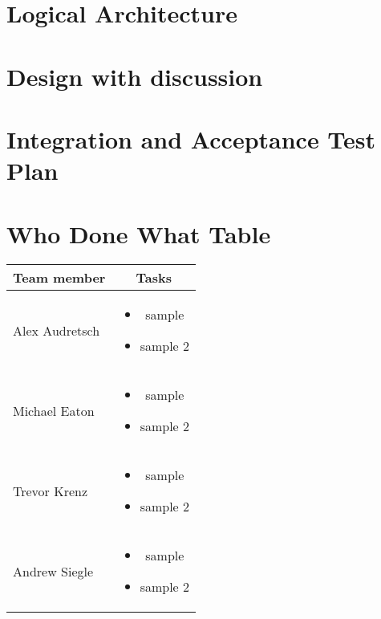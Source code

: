 \documentclass{article}
\begin{document}
\section{Logical Architecture}
\newpage
\section{Design with discussion}
\newpage
\section{Integration and Acceptance Test Plan}
\newpage
\section{Who Done What Table}
\begin{center}
\begin{tabular}{|l|c|}
\hline
Team member & Tasks \\ \hline
Alex Audretsch & 
\begin{minipage}{.4\textwidth}
\vspace{11pt}
\begin{itemize}
	\item sample
	\item sample 2
\end{itemize} 
\end{minipage} \\ \hline
Michael Eaton & 
\begin{minipage}{.4\textwidth}
\vspace{11pt}
\begin{itemize}
	\item sample
	\item sample 2
\end{itemize} 
\end{minipage} \\ \hline
Trevor Krenz & 
\begin{minipage}{.4\textwidth}
\vspace{11pt}
\begin{itemize}
	\item sample
	\item sample 2
\end{itemize} 
\end{minipage} \\ \hline
Andrew Siegle & 
\begin{minipage}{.4\textwidth}
\vspace{11pt}
\begin{itemize}
	\item sample
	\item sample 2
\end{itemize} 
\end{minipage} \\ \hline
\end{tabular}
\end{center}
\end{document}
